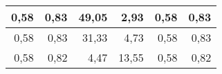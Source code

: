 \begin{table}[H]
{\begin{tabular}{|r|r|r|r|r|r|}
0,58                                                               & 0,83                                                              & 49,05                                                         & 2,93                                                          & 0,58                                                               & 0,83                                                               \\ \hline
0,58                                                               & 0,83                                                              & 31,33                                                         & 4,73                                                          & 0,58                                                               & 0,83                                                               \\ \hline
0,58                                                               & 0,82                                                              & 4,47                                                          & 13,55                                                         & 0,58                                                               & 0,82                                                               \\ \hline
\end{tabular}
    }
\end{table}